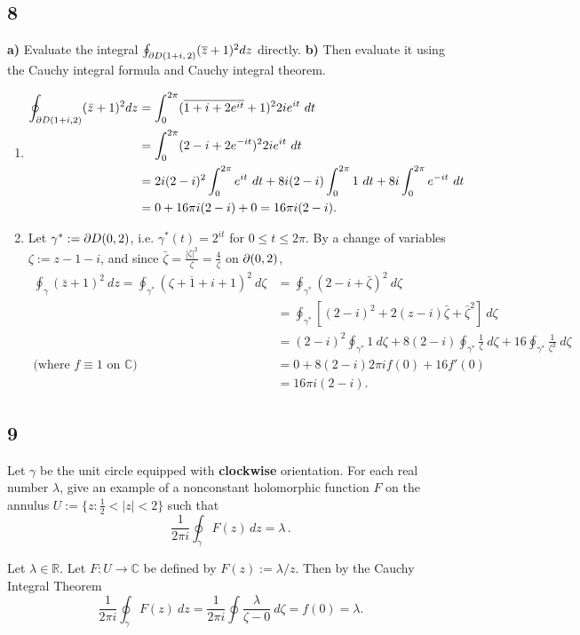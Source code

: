 \documentclass[12pt]{article}
\begin{document}
\subsection*{8}
\begin{tcolorbox}
{\bf a)} Evaluate the integral $\oint_{\partial
D(1+i,\,2)}(\overline z+1)^{2}dz$ directly. {\bf b)}
Then evaluate it using the Cauchy integral formula and Cauchy integral theorem.
\end{tcolorbox}
\begin{enumerate}[label=(\alph*)]
\item 
\begin{align*}
\oint_{\partial D(1+i,2)}(\bar{z} + 1)^{2}dz & = \int_{0}^{2\pi}(\overline{1 + i + 2e^{it}} + 1)^{2}2ie^{it}\ dt \\
& = \int_{0}^{2\pi}(2-i + 2e^{-it})^{2}2ie^{it}\ dt \\
& = 2i(2-i)^2\int_{0}^{2\pi}e^{it}\ dt + 8i(2-i)\int_{0}^{2\pi}1\ dt + 8i \int_{0}^{2\pi}e^{-it}\ dt \\
& = 0 + 16\pi i(2-i) + 0 = 16\pi i(2-i).
\end{align*}
\item Let $\gamma^* := \partial D(0,2)$, i.e. $\gamma^{*}(t) = 2^{it}$ for $0 \leq t \leq 2\pi$. By a change of variables $\zeta := z - 1 - i$, and 
since $\bar{\zeta} = \frac{|\zeta|^2}{\zeta} = \frac{4}{\zeta}$ on $\partial (0,2)$,
\begin{align*}
\oint_{\gamma}(\bar{z} + 1)^{2}\ dz = \oint_{\gamma^*}(\overline{\zeta + 1 + i} + 1)^2\ d\zeta & = \oint_{\gamma^*}(2 - i + \bar{\zeta})^2\ d\zeta \\
& = \oint_{\gamma^*}[(2-i)^2 + 2(z-i)\bar{\zeta} + \bar{\zeta}^2]\ d\zeta \\
& = (2-i)^2 \oint_{\gamma^*}1\ d\zeta + 8(2-i)\oint_{\gamma^*}\frac{1}{\zeta}\ d\zeta + 16\oint_{\gamma^*}\frac{1}{\zeta^2}\ d\zeta \\
\text{(where $f \equiv 1$ on $\mathbb{C}$) }\ \  & = 0 + 8(2-i)2\pi i f(0) + 16 f'(0) \\
& = 16\pi i(2-i).
\end{align*}
\end{enumerate}

\newpage
\subsection*{9}
\begin{tcolorbox}Let $\gamma$ be the unit circle equipped with {\bf clockwise}
orientation. For each real number $\lambda$, give an example of a
nonconstant holomorphic function $F$ on the annulus
$U := \{z:\frac12<|z|<2\}$ such that $$\dfrac{1}{2\pi
i}\oint_{\gamma}F(z)\,dz=\lambda\,.$$
\end{tcolorbox}
Let $\lambda \in \mathbb{R}$. Let $F : U \rightarrow \mathbb{C}$ be defined by $F(z) := \lambda / z$. Then by the Cauchy Integral Theorem
\[ \frac{1}{2\pi i}\oint_{\gamma}F(z)\ dz = \frac{1}{2\pi i}\oint \frac{\lambda}{\zeta - 0}\ d\zeta = f(0) = \lambda. \]
\end{document}
